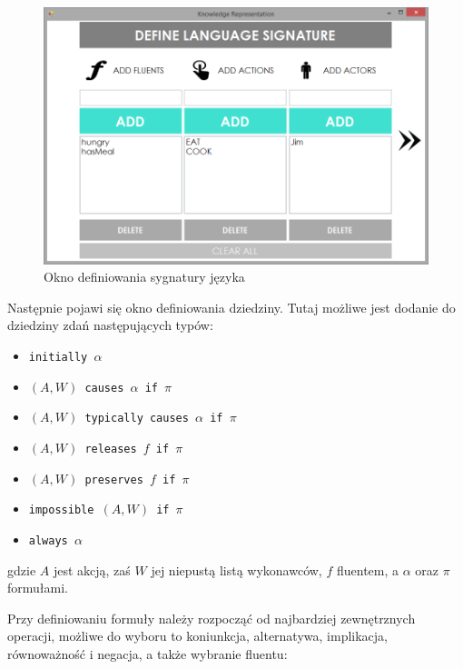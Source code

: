 \documentclass{article}
\begin{document}
\begin{figure}[H]
\centering
\includegraphics[scale=0.4]{05}
\caption{Okno definiowania sygnatury języka}
\end{figure}

Następnie pojawi się okno definiowania dziedziny. Tutaj możliwe jest dodanie do dziedziny zdań następujących typów: 
\begin{itemize}
\item {\large\texttt{initially $\alpha$}}\\
\item {\large\texttt{$(A,W)$ causes $\alpha$ if $\pi$}}\\
\item {\large\texttt{$(A,W)$ typically causes $\alpha$ if $\pi$}}\\
\item {\large\texttt{$(A,W)$ releases $f$ if $\pi$}}\\
\item {\large\texttt{$(A,W)$ preserves $f$ if $\pi$}}\\
\item {\large\texttt{impossible $(A,W)$ if $\pi$}}\\
\item {\large\texttt{always $\alpha$}}\\
\end{itemize}
gdzie $A$ jest akcją, zaś $W$ jej niepustą listą wykonawców, $f$ fluentem, a $\alpha$ oraz $\pi$ formułami.
\newpage

Przy definiowaniu formuły należy rozpocząć od najbardziej zewnętrznych operacji, możliwe do wyboru to koniunkcja, alternatywa, implikacja, równoważność i negacja, a także wybranie fluentu: 
\end{document}
